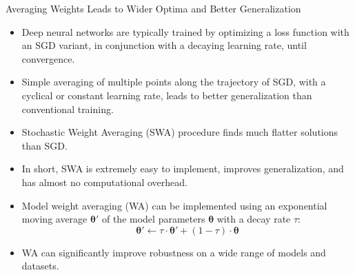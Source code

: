 \begin{frame}{Averaging Weights Leads to Wider Optima and Better Generalization}
    \begin{itemize}[<+-| alert@+>] %
        \item Deep neural networks are typically trained by optimizing a loss function with an SGD variant, in conjunction with a decaying learning rate, until convergence.
        \item Simple averaging of multiple points along the trajectory of SGD, with a cyclical or constant learning rate, leads to better generalization than conventional training.
        \item Stochastic Weight Averaging (SWA) procedure finds much flatter solutions than SGD.
        \item In short, SWA is extremely easy to implement, improves generalization, and has almost no computational overhead.
        \item Model weight averaging (WA) can be implemented using an exponential moving average $\mathbf{\theta}'$ of the model parameters $\mathbf{\theta}$ with a decay rate $\tau$: $$\mathbf{\theta}' \leftarrow \tau \cdot \mathbf{\theta}' + (1-\tau)\cdot\mathbf{\theta}$$
        \item WA can significantly improve robustness on a wide range of models and datasets.
    \end{itemize}
\end{frame}

